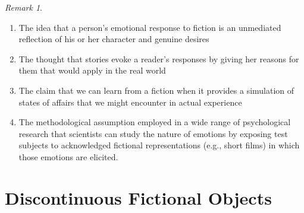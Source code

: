 \documentclass[12pt]{book}
\theoremstyle{definition}
\theoremstyle{remark}
\newtheorem{remark}[theorem]{Remark}
\providecommand{\tightlist}{%
  \setlength{\itemsep}{0pt}\setlength{\parskip}{0pt}}
\begin{document}
\begin{remark}
\leavevmode

\begin{enumerate}
\def\labelenumi{\arabic{enumi}.}
\tightlist
\item
  The idea that a person's emotional response to fiction is an unmediated reflection of his or her character and genuine desires
\item
  The thought that stories evoke a reader's responses by giving her reasons for them that would apply in the real world
\item
  The claim that we can learn from a fiction when it provides a simulation of states of affairs that we might encounter in actual experience
\item
  The methodological assumption employed in a wide range of psychological research that scientists can study the nature of emotions by exposing test subjects to acknowledged fictional representations (e.g., short films) in which those emotions are elicited.
\end{enumerate}

\end{remark}

\section{Discontinuous Fictional Objects}\label{discontinuous-fictional-objects}
\end{document}
